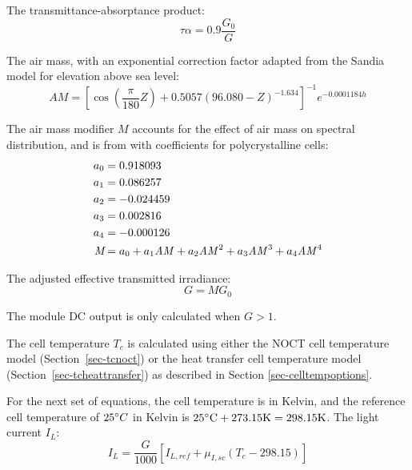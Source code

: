 \documentclass[12pt,letterpaper]{article}
\begin{document}
The transmittance-absorptance product:
\begin{equation}
\tau\alpha = 0.9 \frac{G_0}{G}
\end{equation}

The air mass, with an exponential correction factor adapted from the Sandia model for elevation above sea level:
\begin{equation}\label{eqn-cecam}
\textit{AM} = \left[\cos\left( \frac{\pi}{180}Z \right)+0.5057(96.080-Z)^{-1.634} \right]^{-1} e^{-0.0001184\mathit{h}}
\end{equation}

The air mass modifier $M$ accounts for the effect of air mass on spectral distribution, and is from \citet{king2004} with coefficients for polycrystalline cells:
\begin{align}
a_0 &= 0.918093 \notag\\
a_1 &= 0.086257 \notag\\
a_2 &= -0.024459 \notag\\
a_3 &= 0.002816 \notag\\
a_4 &= -0.000126 \notag\\
\textit{M} &= a_0 + a_1 \mathit{AM} + a_2 \mathit{AM}^2 + a_3\mathit{AM}^3+ a_4\mathit{AM}^4
\end{align}

The adjusted effective transmitted irradiance:
\begin{equation}\label{eqn-effectivetransmittedirradiance}
G =  MG_0
\end{equation}

The module DC output is only calculated when $G>1$.

The cell temperature $T_c$ is calculated using either the NOCT cell temperature model (Section~\ref{sec-tcnoct}) or the heat transfer cell temperature model (Section~\ref{sec-tcheattransfer}) as described in Section \ref{sec-celltempoptions}.

For the next set of equations, the cell temperature is in Kelvin, and the reference cell temperature of $25\degree C$ in Kelvin is $25\degree \text{C} + 273.15 \text{K} = 298.15 \text{K}$.
The light current $I_L$:
\begin{equation}\label{eqn-lightcurrent}
I_L = \frac{G}{1000}\left[I_{L,ref} + \mu_{I,sc} (T_c - 298.15 )\right]
\end{equation}
\end{document}
